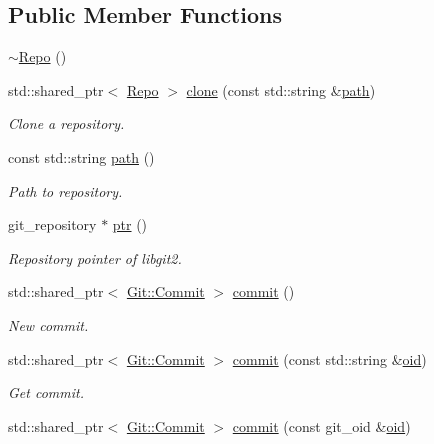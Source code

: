 \subsection*{Public Member Functions}
\begin{DoxyCompactItemize}
\item 
\hyperlink{class_git_1_1_repo_a7040a7f21faf730376faaa97fecbf59b}{$\sim$\-Repo} ()
\item 
std\-::shared\-\_\-ptr$<$ \hyperlink{class_git_1_1_repo}{Repo} $>$ \hyperlink{class_git_1_1_repo_a1ce0dc274b2a8bf8d78bf2f2627a295d}{clone} (const std\-::string \&\hyperlink{class_git_1_1_repo_a2f1d8cc3ef5c9ca9d57738463e75566a}{path})
\begin{DoxyCompactList}\small\item\em Clone a repository. \end{DoxyCompactList}\item 
const std\-::string \hyperlink{class_git_1_1_repo_a2f1d8cc3ef5c9ca9d57738463e75566a}{path} ()
\begin{DoxyCompactList}\small\item\em Path to repository. \end{DoxyCompactList}\item 
git\-\_\-repository $\ast$ \hyperlink{class_git_1_1_repo_a48cad577a0ee3bdb3f45a6c2a3b9cdcb}{ptr} ()
\begin{DoxyCompactList}\small\item\em Repository pointer of libgit2. \end{DoxyCompactList}\item 
std\-::shared\-\_\-ptr$<$ \hyperlink{class_git_1_1_commit}{Git\-::\-Commit} $>$ \hyperlink{class_git_1_1_repo_ae096c38272dd53e4bdff80aa97bab05a}{commit} ()
\begin{DoxyCompactList}\small\item\em New commit. \end{DoxyCompactList}\item 
std\-::shared\-\_\-ptr$<$ \hyperlink{class_git_1_1_commit}{Git\-::\-Commit} $>$ \hyperlink{class_git_1_1_repo_a5475b08bc58dfaa082388688e9173e80}{commit} (const std\-::string \&\hyperlink{namespace_git_a20e639531f5c04252e0ce86622c2e77e}{oid})
\begin{DoxyCompactList}\small\item\em Get commit. \end{DoxyCompactList}\item 
std\-::shared\-\_\-ptr$<$ \hyperlink{class_git_1_1_commit}{Git\-::\-Commit} $>$ \hyperlink{class_git_1_1_repo_af71e0fa2b82a7d044ac74a6719584f63}{commit} (const git\-\_\-oid \&\hyperlink{namespace_git_a20e639531f5c04252e0ce86622c2e77e}{oid})
\end{DoxyCompactItemize}
